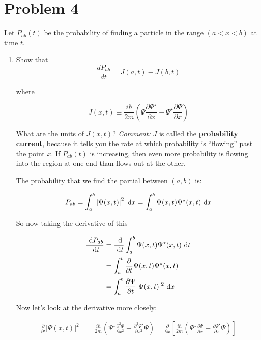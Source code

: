 \documentclass{article}
\begin{document}
\pagebreak
\section*{Problem 4}

Let $P_{ab}(t)$ be the probability of finding a particle in the range $(a < x < b)$ at time $t$.

\begin{enumerate}[label=(\alph*)]
    \item Show that 
    \[ \frac{dP_{ab}}{dt} = J(a, t) - J(b, t)\] 

    where 

    \[ J(x, t) \equiv \frac{i\hbar}{2m}\left(\Psi \frac{\partial \Psi^\star}{\partial x} - \Psi^\star\frac{\partial \Psi}{\partial x}\right)\]

    What are the units of $J(x, t)$? \textit{Comment:} $J$ is called the \textbf{probability current}, because it tells you the rate at which probability is ``flowing'' past the point $x$. If $P_{ab}(t)$ is increasing, then even more probability is flowing into the region at one end than flows out at the other.



    \begin{solution}
        The probability that we find the partial between $(a, b)$ is:

        \[P_{ab} = \int_a^b \left| \Psi(x, t)\right|^2 \ \mathrm d x = \int_a^b \Psi(x, t) \Psi^\star(x, t) \ \mathrm d x\]


        So now taking the derivative of this

        \begin{align*}
            \frac{\ \mathrm d P_{ab}}{\ \mathrm d t} &= \frac{\ \mathrm d}{\ \mathrm d t} \int_a^b \Psi(x, t) \Psi^\star(x, t)\ \mathrm d t\\
            &= \int_a^b \frac{\partial}{\partial t} \Psi(x, t) \Psi^\star(x, t)\\
            &= \int_a^b \frac{\partial \Psi}{\partial t} |\Psi(x, t)|^2 \ \mathrm d x \\
        \end{align*}

        Now let's look at the derivative more closely:

        \begin{align*}
            \frac{\partial}{\partial t}|\Psi(x,t)|^2 &= \frac{i\hbar}{2m}\left(\Psi^\star\frac{\partial^2\Psi}{\partial x^2} - \frac{\partial^2\Psi^\star}{\partial x^2}\Psi\right) = \frac{\partial}{\partial x}\left[\frac{i\hbar}{2m}\left(\Psi^\star\frac{\partial \Psi}{\partial x} - \frac{\partial \Psi^\star}{\partial x}\Psi\right)\right]
        \end{align*}


\end{solution}
\end{enumerate}
\end{document}
